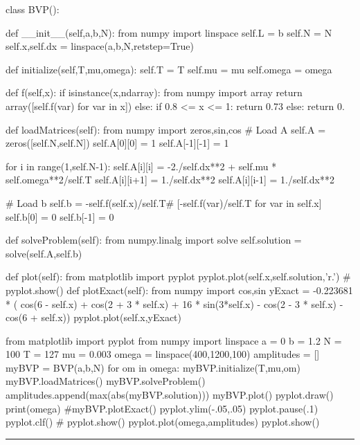 \begin{codeexample}
\begin{VerbatimOut}{\listingFile}
class BVP():

    def __init__(self,a,b,N):
        from numpy import linspace
        self.L = b
        self.N = N
        self.x,self.dx = linspace(a,b,N,retstep=True)

    def initialize(self,T,mu,omega):
        self.T = T
        self.mu = mu
        self.omega = omega

    def f(self,x):
        if isinstance(x,ndarray):
            from numpy import array
            return array([self.f(var) for var in x])
        else:
            if  0.8 <= x <= 1:
                return 0.73
            else:
               return 0.

    def loadMatrices(self):
        from numpy import zeros,sin,cos
        # Load A
        self.A = zeros([self.N,self.N])
        self.A[0][0] = 1
        self.A[-1][-1] = 1

        for i in range(1,self.N-1):
            self.A[i][i] = -2./self.dx**2 + self.mu * self.omega**2/self.T
            self.A[i][i+1] = 1./self.dx**2
            self.A[i][i-1] = 1./self.dx**2

        # Load b
        self.b = -self.f(self.x)/self.T# [-self.f(var)/self.T for var in self.x]
        self.b[0] = 0
        self.b[-1] = 0

    def solveProblem(self):
        from numpy.linalg import solve
        self.solution = solve(self.A,self.b)

    def plot(self):
        from matplotlib import pyplot
        pyplot.plot(self.x,self.solution,'r.')
        #        pyplot.show()
    def plotExact(self):
        from numpy import cos,sin
        yExact = -0.223681 * ( cos(6 - self.x) + cos(2 + 3 * self.x) + 16 * sin(3*self.x) - cos(2 - 3 * self.x) - cos(6 + self.x))
        pyplot.plot(self.x,yExact)

from matplotlib import pyplot
from numpy import linspace
a = 0
b = 1.2
N = 100
T  = 127
mu = 0.003
omega = linspace(400,1200,100)
amplitudes = []
myBVP = BVP(a,b,N)
for om in omega:
    myBVP.initialize(T,mu,om)
    myBVP.loadMatrices()
    myBVP.solveProblem()
    amplitudes.append(max(abs(myBVP.solution)))
    myBVP.plot()
    pyplot.draw()
    print(omega)
    #myBVP.plotExact()
     pyplot.ylim(-.05,.05)
    pyplot.pause(.1)
    pyplot.clf()
    #    pyplot.show()
pyplot.plot(omega,amplitudes)
pyplot.show()
\end{VerbatimOut}
\end{codeexample}
\else
\noindent\rule{5 in}{0.01 in}
\fi

